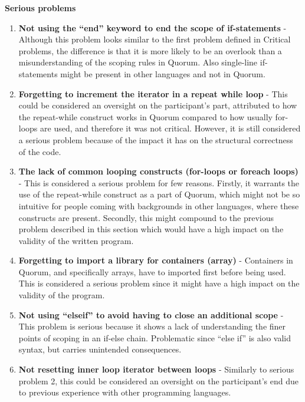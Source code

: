 \textbf{Serious problems}
\begin{enumerate}
\item \textbf{Not using the “end” keyword to end the scope of if-statements} - Although this problem looks similar to the first problem defined in Critical problems, the difference is that it is more likely to be an overlook than a misunderstanding of the scoping rules in Quorum. Also single-line if-statements might be present in other languages and not in Quorum.
\item \textbf{Forgetting to increment the iterator in a repeat while loop} - This could be considered an oversight on the participant’s part, attributed to how the repeat-while construct works in Quorum compared to how usually for-loops are used, and therefore it was not critical. However, it is still considered a serious problem because of the impact it has on the structural correctness of the code.
\item \textbf{The lack of common looping constructs (for-loops or foreach loops)} - This is considered a serious problem for few reasons. Firstly, it warrants the use of the repeat-while construct as a part of Quorum, which might not be so intuitive for people coming with backgrounds in other languages, where these constructs are present. Secondly, this might compound to the previous problem described in this section which would have a high impact on the validity of the written program. 
\item \textbf{Forgetting to import a library for containers (array)} - Containers in Quorum, and specifically arrays, have to imported first before being used. This is considered a serious problem since it might have a high impact on the validity of the program. 
\item \textbf{Not using “elseif” to avoid having to close an additional scope} - This problem is serious because it shows a lack of understanding the finer points of scoping in an if-else chain. Problematic since “else if” is also valid syntax, but carries unintended consequences.
\item \textbf{Not resetting inner loop iterator between loops} - Similarly to serious problem 2, this could be considered an oversight on the participant’s end due to previous experience with other programming languages.
\end{enumerate}

